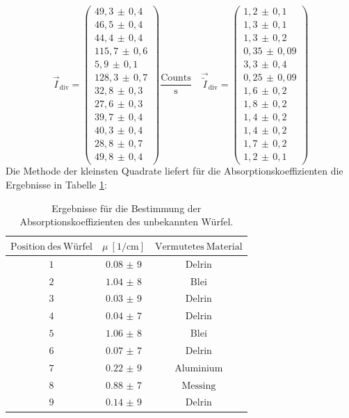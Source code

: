 \begin{equation}
	\vec{I}_\mathrm{div}=
	\begin{pmatrix}
		49,3\,\pm\,0,4 \\
		46,5\,\pm\,0,4 \\
		44,4\,\pm\,0,4\\
		115,7\,\pm\,0,6 \\
		5,9\,\pm\,0,1 \\
    128,3\,\pm\,0,7 \\
		32,8\,\pm\,0,3 \\
		27,6\,\pm\,0,3 \\
		39,7\,\pm\,0,4 \\
		40,3\,\pm\,0,4 \\
		28,8\,\pm\,0,7 \\
    49,8\,\pm\,0,4
	\end{pmatrix}
	\frac{\mathrm{Counts}}{\si{\second}}\quad
	\vec{\tilde{I}}_\mathrm{div}=
	\begin{pmatrix}
    1,2\,\pm\,0,1 \\
		1,3\,\pm\,0,1 \\
		1,3\,\pm\,0,2 \\
		0,35\,\pm\,0,09 \\
		3,3\,\pm\,0,4 \\
    0,25\,\pm\,0,09 \\
		1,6\,\pm\,0,2 \\
		1,8\,\pm\,0,2 \\
		1,4\,\pm\,0,2 \\
		1,4\,\pm\,0,2 \\
		1,7\,\pm\,0,2 \\
    1,2\,\pm\,0,1
	\end{pmatrix}
	\label{eqn:w5}
\end{equation}
\FloatBarrier
\noindent Die Methode der kleinsten Quadrate liefert für die Absorptionskoeffizienten die Ergebnisse in Tabelle \ref{tab:tabdiv}:
\begin{table}
  \centering
  \caption{Ergebnisse für die Bestimmung der Absorptionskoeffizienten des unbekannten Würfel.}
  \label{tab:tabdiv}
  \begin{tabular}{c c c}
    \toprule
		$\mathrm{Position ~ des ~ Würfel}$ & $\mu \: [\si{1\per\centi\meter}]$ & $\mathrm{Vermutetes ~ Material}$ \\
    \midrule
    $\num{1}$ & $\num{0,08(9)}$ & $\mathrm{Delrin}$ \\
		$\num{2}$ & $\num{1,04(8)}$ & $\mathrm{Blei}$ \\
		$\num{3}$ & $\num{0,03(9)}$ & $\mathrm{Delrin}$ \\
    $\num{4}$ & $\num{0,04(7)}$ & $\mathrm{Delrin}$ \\
    $\num{5}$ & $\num{1,06(8)}$ & $\mathrm{Blei}$ \\
    $\num{6}$ & $\num{0,07(7)}$ & $\mathrm{Delrin}$ \\
    $\num{7}$ & $\num{0,22(9)}$ & $\mathrm{Aluminium}$ \\
    $\num{8}$ & $\num{0,88(7)}$ & $\mathrm{Messing}$ \\
    $\num{9}$ & $\num{0,14(9)}$ & $\mathrm{Delrin}$ \\
    \bottomrule
  \end{tabular}
\end{table}
\FloatBarrier
